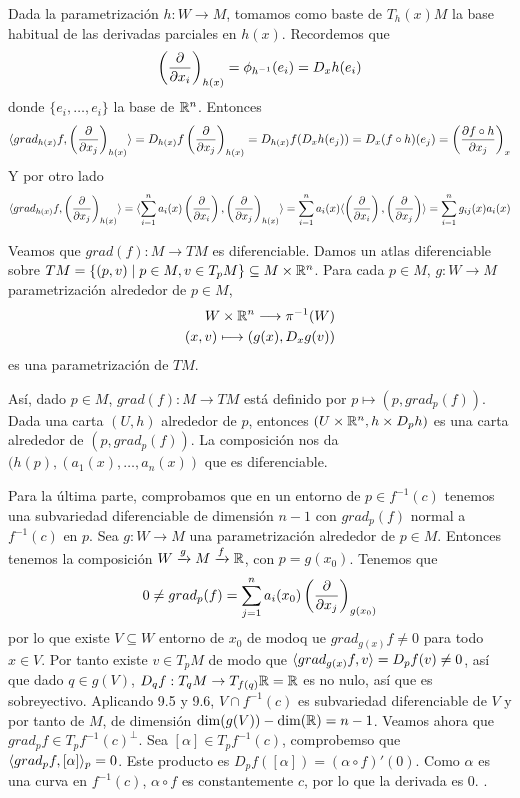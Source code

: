 \documentclass[twoside]{article}
\begin{document}
\begin{solucion}
Dada la parametrización $h:W\to M$, tomamos como baste de $T_h(x)M$ la base habitual de las derivadas parciales en $h(x)$. Recordemos que
\[
\left(\frac{\partial }{\partial x_i}\right)_{h(x)}=\phi_{h^{-1}}(e_i)=D_xh(e_i)
\]
donde $\{e_i,\dots, e_i\}$ la base de $\mathbb{R}^n$. Entonces
\[
\langle{grad_{h(x)}f,\left(\frac{\partial }{\partial x_j}\right)_{h(x)}}\rangle=D_{h(x)}f\left(\frac{\partial }{\partial x_j}\right)_{h(x)}=D_{h(x)}f(D_xh(e_j))=D_x(f\circ h)(e_j)=\left(\frac{\partial f\circ h}{\partial x_j}\right)_x
\]
Y por otro lado 
\[
\langle{grad_{h(x)}f,\left(\frac{\partial }{\partial x_j}\right)_{h(x)}}\rangle=\langle{\sum_{i=1}^na_i(x)\left(\frac{\partial }{\partial x_i}\right),\left(\frac{\partial }{\partial x_j}\right)_{h(x)}}\rangle=\sum_{i=1}^na_i(x)\langle{\left(\frac{\partial }{\partial x_i}\right), \left(\frac{\partial }{\partial x_j}\right)}\rangle=\sum_{i=1}^n g_{ij}(x)a_i(x)
\]

Veamos que $grad(f):M\to TM$ es diferenciable. Damos un atlas diferenciable sobre $TM=\{(p,v)\mid p\in M, v\in T_pM\}\subseteq M\times
\mathbb{R}^n$. Para cada $p\in M$, $g:W\to M$ parametrización alrededor de $p\in M$, 
\begin{align*}
W\times\mathbb{R}^n\longrightarrow \pi^{-1}(W)\\
(x,v)\longmapsto (g(x), D_xg(v))
\end{align*}
es una parametrización de $TM$. 

Así, dado $p\in M$, $grad(f):M\to TM$ está definido por $p\mapsto (p,grad_p(f))$. Dada una carta $(U,h)$ alrededor de $p$, entonces $(U\times\mathbb{R}^n, h\times D_ph)$ es una carta alrededor de $(p,grad_p(f))$. La composición nos da $(h(p), (a_1(x),\dots, a_n(x))$ que es diferenciable. 

Para la última parte, comprobamos que en un entorno de $p\in f^{-1}(c)$ tenemos una subvariedad diferenciable de dimensión $n-1$ con $grad_p(f)$ normal a $f^{-1}(c)$ en $p$. Sea $g:W\to M$ una parametrización alrededor de $p\in M$.  Entonces tenemos la composición $W\xrightarrow{g}M\xrightarrow{f}\mathbb{R}$, con $p=g(x_0)$. Tenemos que
\[
0\neq grad_p(f)=\sum_{j=1}^na_i(x_0)\left(\frac{\partial }{\partial x_j}\right)_{g(x_0)}
\]
por lo que existe $V\subseteq W$ entorno de $x_0$ de modoq ue $grad_{g(x)}f\neq 0$ para todo $x\in V$. Por tanto existe $v\in T_pM$ de modo que $\langle{grad_{g(x)}f,v}\rangle=D_pf(v)\neq 0$, así que dado $q\in g(V)$, $D_qf:T_qM\to T_{f(q)}\mathbb{R}=\mathbb{R}$ es no nulo, así que es sobreyectivo. Aplicando 9.5 y 9.6, $V\cap f^{-1}(c)$ es subvariedad diferenciable de $V$ y por tanto de $M$, de dimensión $\dim(g(V))-\dim(\mathbb{R})=n-1$. Veamos ahora que $grad_pf\in T_pf^{-1}(c)^{\perp}$. Sea $[\alpha]\in T_pf^{-1}(c)$, comprobemso que $\langle{grad_pf,[\alpha]}\rangle_p=0$. Este producto es $D_pf([\alpha])=(\alpha\circ f)'(0)$. Como $\alpha$ es una curva en $f^{-1}(c)$, $\alpha\circ f$ es constantemente $c$, por lo que la derivada es 0. 
. 
\end{solucion}
\newpage
\end{document}
